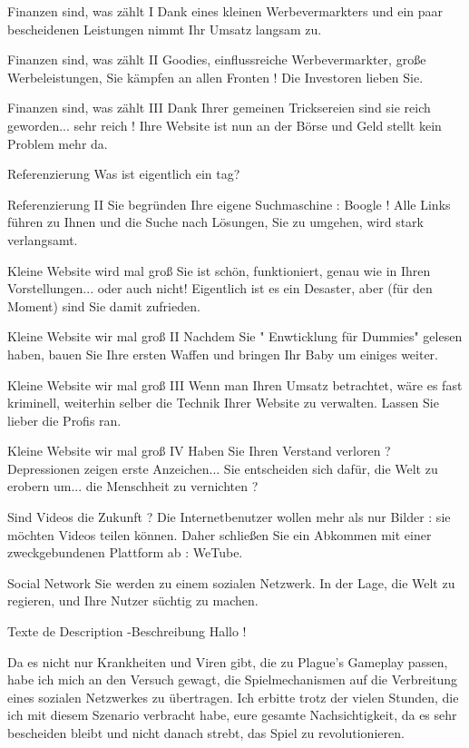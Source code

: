 Finanzen sind, was zählt I
Dank eines kleinen Werbevermarkters und ein paar bescheidenen Leistungen nimmt Ihr Umsatz langsam zu.

Finanzen sind, was zählt II
Goodies, einflussreiche Werbevermarkter, große Werbeleistungen, Sie kämpfen an allen Fronten ! Die Investoren lieben Sie.

Finanzen sind, was zählt III
Dank Ihrer gemeinen Tricksereien sind sie reich geworden... sehr reich ! Ihre Website ist nun an der Börse und Geld stellt kein Problem mehr da.



Referenzierung
Was ist eigentlich ein tag?

Referenzierung II
Sie begründen Ihre eigene Suchmaschine : Boogle ! Alle Links führen zu Ihnen und die Suche nach Lösungen, Sie zu umgehen, wird stark verlangsamt.



Kleine Website wird mal groß
Sie ist schön, funktioniert, genau wie in Ihren Vorstellungen... oder auch nicht! Eigentlich ist es ein Desaster, aber (für den Moment) sind Sie damit zufrieden.

Kleine Website wir mal groß II
Nachdem Sie " Enwticklung für Dummies" gelesen haben, bauen Sie Ihre ersten Waffen und bringen Ihr Baby um einiges weiter.

Kleine Website wir mal groß III
Wenn man Ihren Umsatz betrachtet, wäre es fast kriminell, weiterhin selber die Technik Ihrer Website zu verwalten. Lassen Sie lieber die Profis ran.

Kleine Website wir mal groß IV
Haben Sie Ihren Verstand verloren ? Depressionen zeigen erste Anzeichen... Sie entscheiden sich dafür, die Welt zu erobern um... die Menschheit zu vernichten ?



Sind Videos die Zukunft ?
Die Internetbenutzer wollen mehr als nur Bilder : sie möchten Videos teilen können. Daher schließen Sie ein Abkommen mit einer zweckgebundenen Plattform ab : WeTube.



Social Network
Sie werden zu einem sozialen Netzwerk. In der Lage, die Welt zu regieren, und Ihre Nutzer süchtig zu machen.


Texte de Description -Beschreibung %
Hallo !

Da es nicht nur Krankheiten und Viren gibt, die zu Plague's Gameplay passen, habe ich mich an den Versuch gewagt, die Spielmechanismen auf die Verbreitung eines sozialen Netzwerkes zu übertragen. Ich erbitte trotz der vielen Stunden, die ich mit diesem Szenario verbracht habe, eure gesamte Nachsichtigkeit, da es sehr bescheiden bleibt und nicht danach strebt, das Spiel zu revolutionieren.

